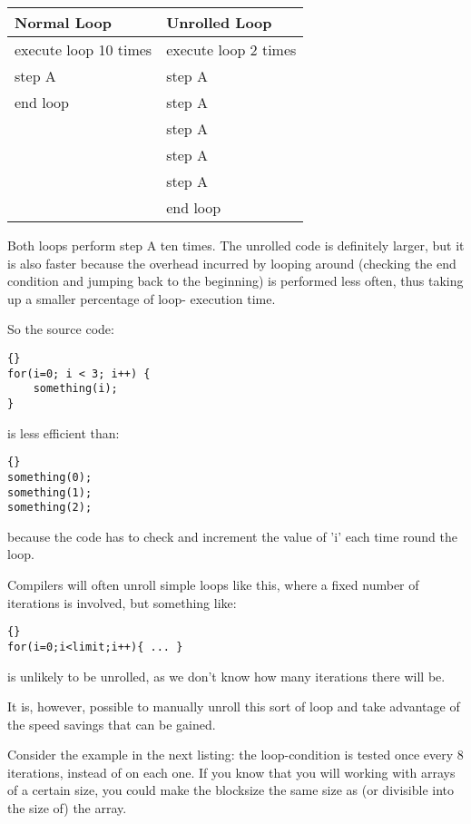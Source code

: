 \documentclass{report}
\begin{document}
\begin{tabular}{|l|l|}
\hline
Normal Loop             & Unrolled Loop \\ 
\hline
execute loop 10 times   & execute loop 2 times \\ 
step A                  & step A \\
end loop                & step A \\
                        & step A \\
                        & step A \\
                        & step A \\
                        & end loop \\
\hline
\end{tabular}
\newline

Both loops perform step A ten times. The unrolled code is definitely larger, but it is also faster because the overhead incurred by looping around (checking the end condition and jumping back to the beginning) is performed less often, thus taking up a smaller percentage of loop- execution time.

So the source code:
\begin{lstlisting}{}
for(i=0; i < 3; i++) {
    something(i);
}
\end{lstlisting}
is less efficient than:
\begin{lstlisting}{}
something(0);
something(1);
something(2);
\end{lstlisting}
because the code has to check and increment the value of 'i' each time round the loop.

Compilers will often unroll simple loops like this, where a fixed number of iterations is involved, but something like:
\begin{lstlisting}{}
for(i=0;i<limit;i++){ ... }
\end{lstlisting}
is unlikely to be unrolled, as we don't know how many iterations there will be.

It is, however, possible to manually unroll this sort of loop and take advantage of the speed savings that can be gained.

Consider the example in the next listing: the loop-condition is tested once every 8 iterations, instead of on each one. If you know that you will working with arrays of a certain size, you could make the blocksize the same size as (or divisible into the size of) the array.


\end{document}
